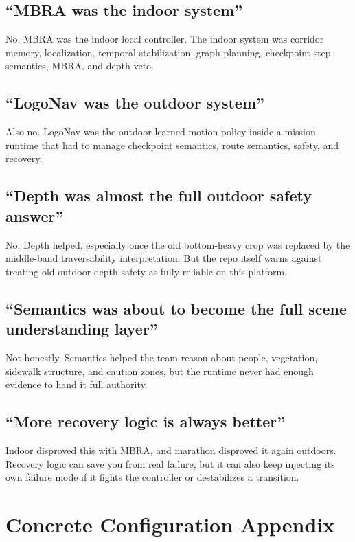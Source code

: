 \documentclass[11pt]{article}
\begin{document}
\subsection{``MBRA was the indoor system''}

No. MBRA was the indoor local controller. The indoor system was corridor memory,
localization, temporal stabilization, graph planning, checkpoint-step semantics,
MBRA, and depth veto.

\subsection{``LogoNav was the outdoor system''}

Also no. LogoNav was the outdoor learned motion policy inside a mission runtime
that had to manage checkpoint semantics, route semantics, safety, and recovery.

\subsection{``Depth was almost the full outdoor safety answer''}

No. Depth helped, especially once the old bottom-heavy crop was replaced by the
middle-band traversability interpretation. But the repo itself warns against
treating old outdoor depth safety as fully reliable on this platform.

\subsection{``Semantics was about to become the full scene understanding layer''}

Not honestly. Semantics helped the team reason about people, vegetation, sidewalk
structure, and caution zones, but the runtime never had enough evidence to hand it
full authority.

\subsection{``More recovery logic is always better''}

Indoor disproved this with MBRA, and marathon disproved it again outdoors. Recovery
logic can save you from real failure, but it can also keep injecting its own
failure mode if it fights the controller or destabilizes a transition.

\section{Concrete Configuration Appendix}
\end{document}
